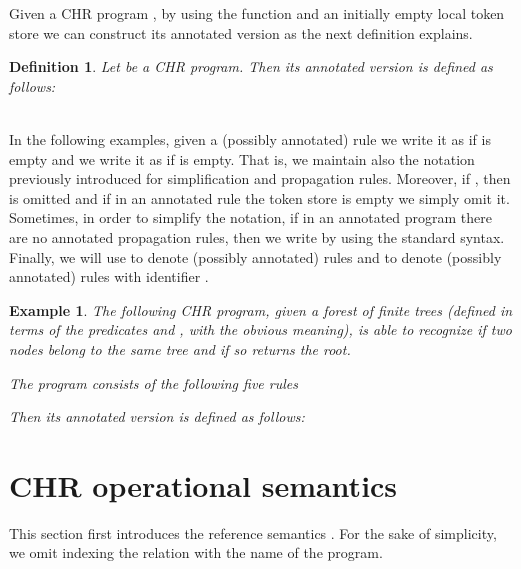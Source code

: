 \documentclass{tlp}
\newtheorem{definition}{Definition} \newtheorem{proposition}{Proposition} \newtheorem{example}{Example} \newtheorem{corollary}{Corollary} \newtheorem{theorem}{Theorem} \newtheorem{lemma}{Lemma}
\begin{document}
Given a CHR program , by using the function  and
an initially empty local token store we can construct its annotated
version as the next definition explains.


\begin{definition}
Let  be a CHR program. Then its annotated version is defined as follows:

\end{definition}


 \\
In the following examples, given a
(possibly annotated) rule
   we write it as
 if  is empty and
we write it as
 if  is empty.
That is, we maintain also the notation previously introduced for
simplification and propagation rules. Moreover, if , then  is omitted
and if in an annotated rule the token store is empty we
simply  omit it.
Sometimes, in order to simplify the notation, if in an annotated program  there are no annotated propagation rules, then we write  by using the standard syntax.\\


Finally, we will use  to denote (possibly annotated) rules
and
 to denote (possibly annotated) rules with identifier .


\begin{example}\label{chiara}
The following CHR program, given a forest of finite trees
(defined in terms of the predicates  and , with the obvious meaning), is
able to recognize if two nodes belong to the same tree and if so returns the root.

The program  consists of the following five rules



Then its annotated version  is defined as follows:


\end{example}







\section{CHR operational semantics}\label{sec:semantics}

This section first introduces the reference semantics  \cite{DSGH04}. For the sake of simplicity, we omit indexing the relation with the name of the program.
\end{document}
